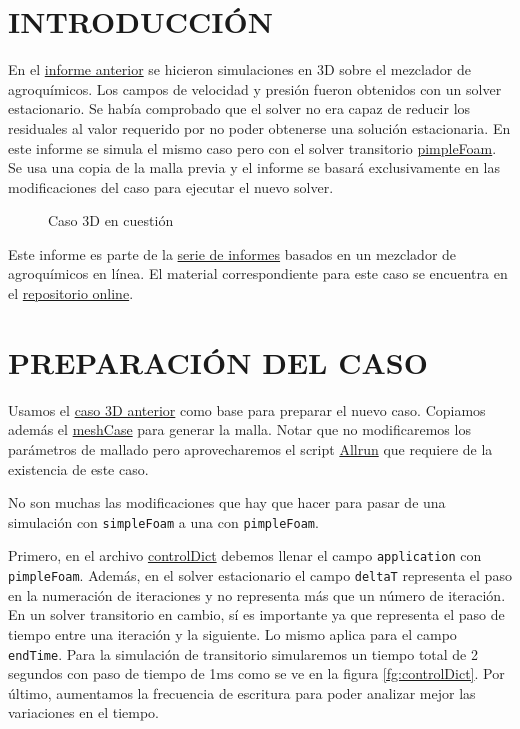 \documentclass[oneside,a4paper,spanish,links]{amca}
\begin{document}
\section{INTRODUCCIÓN}
En el \href{https://github.com/guillerolle/informes_cfd/blob/master/Informe03.pdf}{informe anterior} se hicieron simulaciones en 3D sobre el mezclador de agroquímicos. Los campos de velocidad y presión fueron obtenidos con un solver estacionario. Se había comprobado que el solver no era capaz de reducir los residuales al valor requerido por no poder obtenerse una solución estacionaria. En este informe se simula el mismo caso pero con el solver transitorio \href{https://www.openfoam.com/documentation/guides/latest/doc/guide-applications-solvers-incompressible-pimpleFoam.html}{pimpleFoam}. Se usa una copia de la malla previa y el informe se basará exclusivamente en las modificaciones del caso para ejecutar el nuevo solver. 

\begin{figure}[htb]
	\caption{Caso 3D en cuestión} \label{fg:intro}
\end{figure}

Este informe es parte de la \href{https://github.com/guillerolle/informes_cfd}{serie de informes} basados en un mezclador de agroquímicos en línea. El material correspondiente para este caso se encuentra en el \href{https://github.com/guillerolle/casos_cfd}{repositorio online}.

\section{PREPARACIÓN DEL CASO}
Usamos el \href{https://github.com/guillerolle/casos_cfd/tree/master/03/case}{caso 3D anterior} como base para preparar el nuevo caso. Copiamos además el \href{https://github.com/guillerolle/casos_cfd/tree/master/03/meshCase}{meshCase} para generar la malla. Notar que no modificaremos los parámetros de mallado pero aprovecharemos el script \href{https://github.com/guillerolle/casos_cfd/tree/master/03/case/Allrun}{Allrun} que requiere de la existencia de este caso.

No son muchas las modificaciones que hay que hacer para pasar de una simulación con \texttt{simpleFoam} a una con \texttt{pimpleFoam}. 

Primero, en el archivo \href{https://github.com/guillerolle/casos_cfd/tree/master/04/case/system/controlDict}{controlDict} debemos llenar el campo \texttt{application} con \texttt{pimpleFoam}. Además, en el solver estacionario el campo \texttt{deltaT} representa el paso en la numeración de iteraciones y no representa más que un número de iteración. En un solver transitorio en cambio, sí es importante ya que representa el paso de tiempo entre una iteración y la siguiente. Lo mismo aplica para el campo \texttt{endTime}. Para la simulación de transitorio simularemos un tiempo total de 2 segundos con paso de tiempo de 1ms como se ve en la figura \ref{fg:controlDict}. Por último, aumentamos la frecuencia de escritura para poder analizar mejor las variaciones en el tiempo.
\end{document}
